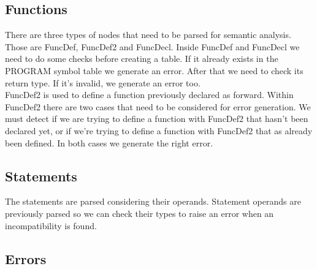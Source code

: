 \documentclass[12pt]{article}
\begin{document}
\subsection{Functions}
There are three types of nodes that need to be parsed for semantic analysis. Those are FuncDef, FuncDef2 and FuncDecl. Inside FuncDef and FuncDecl we need to do some checks before creating a table. If it already exists in the PROGRAM symbol table we generate an error. After that we need to check its return type. If it's invalid, we generate an error too. \\
FuncDef2 is used to define a function previously declared as forward. Within FuncDef2 there are two cases that need to be considered for error generation. We must detect if we are trying to define a function with FuncDef2 that hasn't been declared yet, or if we're trying to define a function with FuncDef2 that as already been defined. In both cases we generate the right error. \\

\subsection{Statements}
The statements are parsed considering their operands. Statement operands are previously parsed so we can check their types to raise an error when an incompatibility is found.\\

\subsection{Errors}
\end{document}
